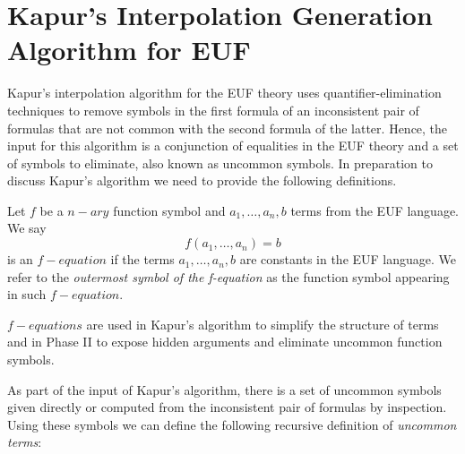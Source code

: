 \section{Kapur's Interpolation Generation Algorithm for EUF}

Kapur's interpolation algorithm for the EUF theory uses quantifier-elimination
techniques to remove symbols in the first formula of an inconsistent pair of formulas
that are not common with the second formula of the latter. 
Hence, the input for this algorithm is a conjunction of equalities in the
EUF theory and a set of symbols to eliminate, also known as uncommon symbols.
In preparation to discuss Kapur's algorithm we need to provide the 
following definitions.

\begin{definition} 
  Let $f$ be a $n-ary$ function symbol and $a_1, \dots, a_n,
  b$ terms from the EUF language. We say 
  \begin{equation*}
    f(a_1, \dots, a_n) = b
  \end{equation*}
  is an $f-equation$ if the terms $a_1, \dots, a_n, b$ are constants in
  the EUF language. We refer to the \emph{outermost symbol of the f-equation}
  as the function symbol appearing in such $f-equation$.
\end{definition}

$f-equations$ are used in Kapur's algorithm to simplify the structure of terms 
and in Phase II to expose hidden arguments and eliminate uncommon function symbols.

As part of the input of Kapur's algorithm, there is a set of uncommon symbols given 
directly or computed from the inconsistent pair of formulas by inspection. Using
these symbols we can define the following recursive definition of \emph{uncommon terms}:

